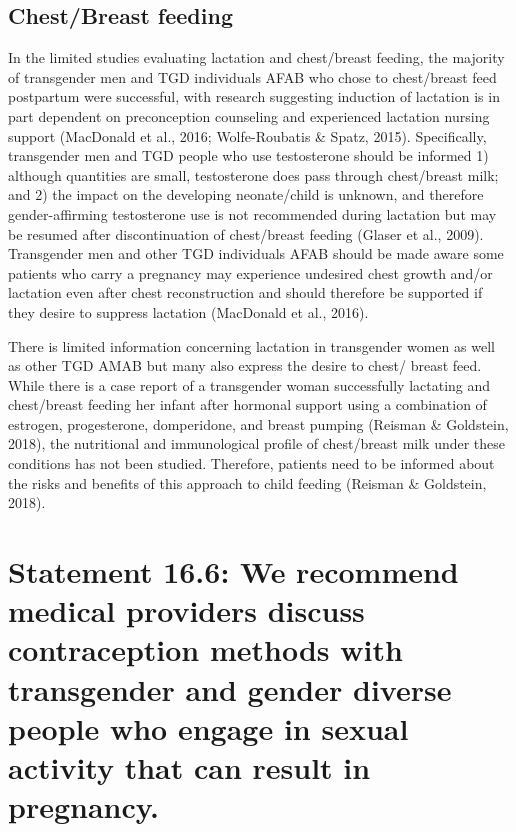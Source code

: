 \documentclass[
]{book}
\begin{document}
\hypertarget{chestbreast-feeding}{%
\subsection*{Chest/Breast feeding}\label{chestbreast-feeding}}

In the limited studies evaluating lactation and
chest/breast feeding, the majority of transgender
men and TGD individuals AFAB who chose to
chest/breast feed postpartum were successful,
with research suggesting induction of lactation
is in part dependent on preconception counseling
and experienced lactation nursing support
(MacDonald et al., 2016; Wolfe-Roubatis \& Spatz,
2015). Specifically, transgender men and TGD
people who use testosterone should be informed
1) although quantities are small, testosterone
does pass through chest/breast milk; and 2) the
impact on the developing neonate/child is
unknown, and therefore gender-affirming testosterone use is not recommended during lactation
but may be resumed after discontinuation of
chest/breast feeding (Glaser et al., 2009).
Transgender men and other TGD individuals
AFAB should be made aware some patients who
carry a pregnancy may experience undesired
chest growth and/or lactation even after chest
reconstruction and should therefore be supported
if they desire to suppress lactation (MacDonald
et al., 2016).

There is limited information concerning lactation in transgender women as well as other TGD
AMAB but many also express the desire to chest/
breast feed. While there is a case report of a
transgender woman successfully lactating and
chest/breast feeding her infant after hormonal
support using a combination of estrogen, progesterone, domperidone, and breast pumping
(Reisman \& Goldstein, 2018), the nutritional and
immunological profile of chest/breast milk under
these conditions has not been studied. Therefore,
patients need to be informed about the risks and
benefits of this approach to child feeding
(Reisman \& Goldstein, 2018).

\hypertarget{statement-16.6-we-recommend-medical-providers-discuss-contraception-methods-with-transgender-and-gender-diverse-people-who-engage-in-sexual-activity-that-can-result-in-pregnancy.}{%
\section*{Statement 16.6: We recommend medical providers discuss contraception methods with transgender and gender diverse people who engage in sexual activity that can result in pregnancy.}\label{statement-16.6-we-recommend-medical-providers-discuss-contraception-methods-with-transgender-and-gender-diverse-people-who-engage-in-sexual-activity-that-can-result-in-pregnancy.}}
\end{document}
